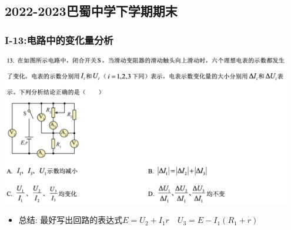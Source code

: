 \documentclass{article}
\begin{document}
\vspace{2em}


\subsection{2022-2023巴蜀中学下学期期末}
\subsubsection{I-13:电路中的变化量分析}
\includegraphics[width=0.95\textwidth,keepaspectratio]{./pictures/1.3-2.png}

\begin{itemize}
    \item 总结: \quad 最好写出回路的表达式$E = U_{2} + I_{1}r  \quad U_{3} = E - I_{1}(R_{1} + r)$
\end{itemize}

\vspace{2em}
\end{document}
